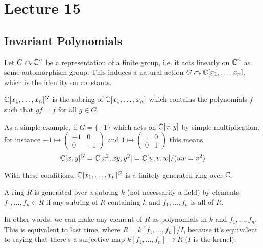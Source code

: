 \section{Lecture 15}
\subsection{Invariant Polynomials}
Let $G \curvearrowright \operatorname{\mathbb{C}}^n$ be a representation of a finite group,
i.e. it acts linearly on $\operatorname{\mathbb{C}}^n$ as some automorphism group.
This induces a natural action $G \curvearrowright \operatorname{\mathbb{C}}[x_1, \dots, x_n]$,
which is the identity on constants.
\begin{definition}
    $\operatorname{\mathbb{C}}[x_1, \dots, x_n]^G$ is the subring of $\operatorname{\mathbb{C}}[x_1, \dots, x_n]$
    which contains the polynomials $f$ such that $gf = f$ for all $g \in G$.
\end{definition}
As a simple example, if $G = \{\pm 1\}$ which acts on $\operatorname{\mathbb{C}}[x, y]$ by simple multiplication,
for instance $-1 \mapsto \begin{pmatrix}-1& 0 \\ 0 & -1\end{pmatrix}$ and $1 \mapsto \begin{pmatrix}1 & 0\\ 0 & 1\end{pmatrix}$
this means
\[ \operatorname{\mathbb{C}}[x, y]^G = \operatorname{\mathbb{C}}[x^2, xy, y^2] = \operatorname{\mathbb{C}}[u, v, w]/(uw = v^2) \]
\begin{theorem}[Hilbert]
    With these conditions, $\operatorname{\mathbb{C}}[x_1, \dots, x_n]^G$ is a finitely-generated ring over $\operatorname{\mathbb{C}}$.
\end{theorem}
\begin{definition}
    A ring $R$ is generated over a subring $k$ (not necessarily a field) by elements $f_1, \dots, f_n \in R$ if
    any subring of $R$ containing $k$ and $f_1, \dots, f_n$ is all of $R$.
\end{definition}
In other words, we can make any element of $R$ as polynomials in $k$ and $f_1, \dots, f_n$.
This is equivalent to last time, where $R = k[f_1, \dots, f_n]/I$, 
because it's equivalent to saying that there's a surjective map $k[f_1, \dots, f_n] \rightarrow R$ ($I$ is the kernel).

